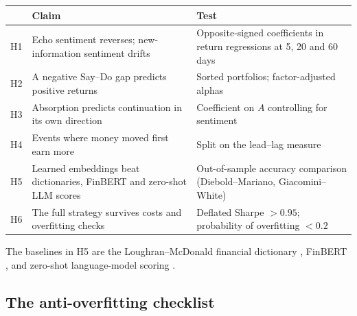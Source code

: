 \documentclass[11pt,a4paper]{article}
\theoremstyle{plain}
\theoremstyle{definition}
\begin{document}
\begin{center}
\small
\begin{tabularx}{\textwidth}{@{}lXX@{}}
\toprule
& Claim & Test \\
\midrule
H1 & Echo sentiment reverses; new-information sentiment drifts & Opposite-signed coefficients in return regressions at 5, 20 and 60 days \\
H2 & A negative Say--Do gap predicts positive returns & Sorted portfolios; factor-adjusted alphas \\
H3 & Absorption predicts continuation in its own direction & Coefficient on $A$ controlling for sentiment \\
H4 & Events where money moved first earn more & Split on the lead--lag measure \\
H5 & Learned embeddings beat dictionaries, FinBERT and zero-shot LLM scores & Out-of-sample accuracy comparison (Diebold--Mariano, Giacomini--White) \\
H6 & The full strategy survives costs and overfitting checks & Deflated Sharpe $> 0.95$; probability of overfitting $< 0.2$ \\
\bottomrule
\end{tabularx}
\end{center}

The baselines in H5 are the Loughran--McDonald financial dictionary \citep{loughran2011}, FinBERT \citep{araci2019}, and zero-shot language-model scoring \citep{lopezlira2023}.

\subsection{The anti-overfitting checklist}
\end{document}
